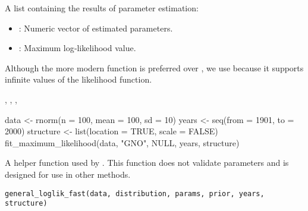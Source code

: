 \documentclass[a4paper]{book}
\begin{document}
%
\begin{Value}
A list containing the results of parameter estimation:
\begin{itemize}

\item{} : Numeric vector of estimated parameters.
\item{} : Maximum log‐likelihood value.

\end{itemize}

\end{Value}
%
\begin{Note}
Although the more modern  function is preferred over
, we use  because it supports infinite
values of the likelihood function.
\end{Note}
%
\begin{SeeAlso}
, , ,
\end{SeeAlso}
%
\begin{Examples}
\begin{ExampleCode}
data <- rnorm(n = 100, mean = 100, sd = 10)
years <- seq(from = 1901, to = 2000)
structure <- list(location = TRUE, scale = FALSE)
fit_maximum_likelihood(data, "GNO", NULL, years, structure)

\end{ExampleCode}
\end{Examples}
%
\begin{Description}
A helper function used by .
This function does not validate parameters and is designed for use in other methods.
\end{Description}
%
\begin{Usage}
\begin{verbatim}
general_loglik_fast(data, distribution, params, prior, years, structure)
\end{verbatim}
\end{Usage}
%
\end{document}
